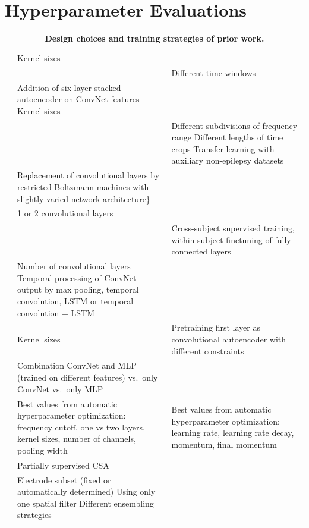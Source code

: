 \section{Hyperparameter Evaluations}\label{hyperparameter-evaluations}

\begin{table}[ht]
    \small
    \myfloatalign
    \begin{tabularx}{\textwidth}{p{}p{}p{}} \toprule
        \tableheadlinewithwidth{0.1\textwidth}{\large Study} & \tableheadlinewithwidth{0.4\textwidth}{\large Design choices}
        & \tableheadlinewithwidth{0.4\textwidth}{\large Training strategies} \\ 
        \midrule
    \cite{lawhern_eegnet:_2016} & Kernel sizes & \\
\cite{sun_remembered_2016} & & Different time windows \\
\cite{tabar_novel_2017} & Addition of six-layer stacked
autoencoder on ConvNet features Kernel sizes & \\
\cite{liang_predicting_2016} & & Different subdivisions of
frequency range Different lengths of time crops Transfer learning with
auxiliary non-epilepsy datasets \\
\cite{hajinoroozi_eeg-based_2016} & Replacement of
convolutional layers by restricted Boltzmann machines with slightly
varied network architecture\} & \\
\cite{antoniades_deep_2016} & 1 or 2 convolutional layers
& \\
\cite{page_wearable_2016} & & Cross-subject supervised
training, within-subject finetuning of fully connected layers \\
\cite{bashivan_learning_2016} & Number of convolutional
layers Temporal processing of ConvNet output by max pooling, temporal
convolution, LSTM or temporal convolution + LSTM & \\
\cite{stober_learning_2016} & Kernel sizes & Pretraining
first layer as convolutional autoencoder with different constraints \\
\cite{sakhavi_parallel_2015} & Combination ConvNet and MLP
(trained on different features) vs.~only ConvNet vs.~only MLP & \\
\cite{stober_using_2014} & Best values from automatic
hyperparameter optimization: frequency cutoff, one vs two layers, kernel
sizes, number of channels, pooling width & Best values from automatic
hyperparameter optimization: learning rate, learning rate decay,
momentum, final momentum \\
\cite{wang_deep_2013} & Partially supervised CSA & \\
\cite{cecotti_convolutional_2011} & Electrode subset (fixed
or automatically determined) Using only one spatial filter Different
ensembling strategies & \\
        \bottomrule
    \end{tabularx}
    \caption[Design choices and training strategies of prior work.]{\textbf{Design choices and training strategies of prior work.}}  \label{prior-work-design-choices-table}
\end{table}

